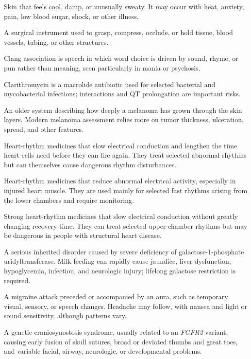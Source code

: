  Skin that feels cool, damp, or unusually sweaty. It may occur with heat, anxiety, pain, low blood sugar, shock, or other illness.

 A surgical instrument used to grasp, compress, occlude, or hold tissue, blood vessels, tubing, or other structures.

 Clang association is speech in which word choice is driven by sound, rhyme, or pun rather than meaning, seen particularly in mania or psychosis.

 Clarithromycin is a macrolide antibiotic used for selected bacterial and mycobacterial infections; interactions and QT prolongation are important risks.

 An older system describing how deeply a melanoma has grown through the skin layers. Modern melanoma assessment relies more on tumor thickness, ulceration, spread, and other features.

 Heart-rhythm medicines that slow electrical conduction and lengthen the time heart cells need before they can fire again. They treat selected abnormal rhythms but can themselves cause dangerous rhythm disturbances.

 Heart-rhythm medicines that reduce abnormal electrical activity, especially in injured heart muscle. They are used mainly for selected fast rhythms arising from the lower chambers and require monitoring.

 Strong heart-rhythm medicines that slow electrical conduction without greatly changing recovery time. They can treat selected upper-chamber rhythms but may be dangerous in people with structural heart disease.

 A serious inherited disorder caused by severe deficiency of galactose-1-phosphate uridyltransferase. Milk feeding can rapidly cause jaundice, liver dysfunction, hypoglycemia, infection, and neurologic injury; lifelong galactose restriction is required.

 A migraine attack preceded or accompanied by an aura, such as temporary visual, sensory, or speech changes. Headache may follow, with nausea and light or sound sensitivity, although patterns vary.

 A genetic craniosynostosis syndrome, usually related to an \textit{FGFR2} variant, causing early fusion of skull sutures, broad or deviated thumbs and great toes, and variable facial, airway, neurologic, or developmental problems.

